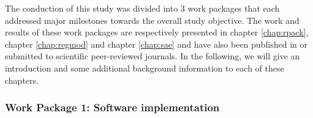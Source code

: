 The conduction of this study was divided into 3 work packages that each addressed major milestones towards the overall study objective. The work and results of these work packages are respectively presented in chapter \ref{chap:rpack}, chapter \ref{chap:regmod} and chapter \ref{chap:sae} and have also been published in or submitted to scientific peer-reviewed journals. In the following, we will give an introduction and some additional background information to each of these chapters.


\subsubsection{Work Package 1: Software implementation} %



